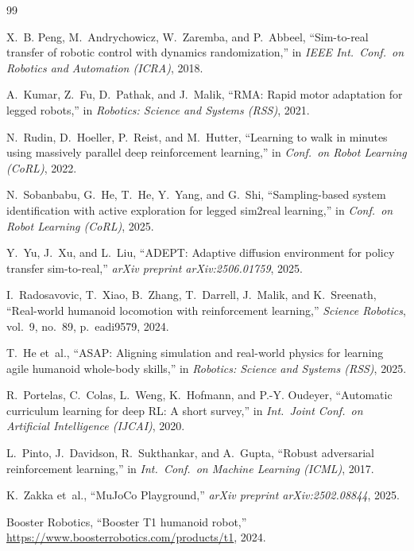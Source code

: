 \documentclass[10pt,twocolumn]{article}
\begin{document}

\begin{thebibliography}{99}

X.~B. Peng, M.~Andrychowicz, W.~Zaremba, and P.~Abbeel,
``Sim-to-real transfer of robotic control with dynamics randomization,''
in \emph{IEEE Int.\ Conf.\ on Robotics and Automation (ICRA)}, 2018.

A.~Kumar, Z.~Fu, D.~Pathak, and J.~Malik,
``{RMA}: Rapid motor adaptation for legged robots,''
in \emph{Robotics: Science and Systems (RSS)}, 2021.

N.~Rudin, D.~Hoeller, P.~Reist, and M.~Hutter,
``Learning to walk in minutes using massively parallel deep reinforcement
learning,''
in \emph{Conf.\ on Robot Learning (CoRL)}, 2022.

N.~Sobanbabu, G.~He, T.~He, Y.~Yang, and G.~Shi,
``Sampling-based system identification with active exploration for legged
sim2real learning,''
in \emph{Conf.\ on Robot Learning (CoRL)}, 2025.

Y.~Yu, J.~Xu, and L.~Liu,
``{ADEPT}: Adaptive diffusion environment for policy transfer
sim-to-real,''
\emph{arXiv preprint arXiv:2506.01759}, 2025.

I.~Radosavovic, T.~Xiao, B.~Zhang, T.~Darrell, J.~Malik, and
K.~Sreenath,
``Real-world humanoid locomotion with reinforcement learning,''
\emph{Science Robotics}, vol.~9, no.~89, p.~eadi9579, 2024.

T.~He et~al.,
``{ASAP}: Aligning simulation and real-world physics for learning agile
humanoid whole-body skills,''
in \emph{Robotics: Science and Systems (RSS)}, 2025.

R.~Portelas, C.~Colas, L.~Weng, K.~Hofmann, and P.-Y. Oudeyer,
``Automatic curriculum learning for deep {RL}: A short survey,''
in \emph{Int.\ Joint Conf.\ on Artificial Intelligence (IJCAI)}, 2020.

L.~Pinto, J.~Davidson, R.~Sukthankar, and A.~Gupta,
``Robust adversarial reinforcement learning,''
in \emph{Int.\ Conf.\ on Machine Learning (ICML)}, 2017.

K.~Zakka et~al.,
``MuJoCo Playground,''
\emph{arXiv preprint arXiv:2502.08844}, 2025.

Booster Robotics,
``Booster {T1} humanoid robot,''
\url{https://www.boosterrobotics.com/products/t1}, 2024.

\end{thebibliography}
\end{document}
